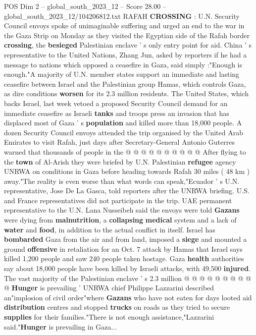 \begin{textsample}{POS Dim 2 – global\_south\_2023\_12 – Score 28.00 – global\_south\_2023\_12/104206812.txt}  \label{ex:f2_pos_028}
RAFAH \textbf{CROSSING} : U.N.
Security Council envoys spoke of unimaginable suffering and urged an end to the war in the Gaza Strip on Monday as they visited the Egyptian side of the Rafah border \textbf{crossing}, the \textbf{besieged} Palestinian enclave ' s only entry point for aid.
China ' s representative to the United Nations, Zhang Jun, asked by reporters if he had a message to nations which opposed a ceasefire in Gaza, said simply :"Enough is enough."A majority of U.N. member states support an immediate and lasting ceasefire between Israel and the Palestinian group Hamas, which controls Gaza, as dire conditions \textbf{worsen} for its 2.3 million residents.
The United States, which backs Israel, last week vetoed a proposed Security Council demand for an immediate ceasefire as Israeli \textbf{tanks} and troops press an invasion that has displaced most of Gaza ' s \textbf{population} and killed more than 18,000 people.
A dozen Security Council envoys attended the trip organised by the United Arab Emirates to visit Rafah, just days after Secretary-General Antonio Guterres warned that thousands of people in the @ @ @ @ @ @ @ @ @ @ After flying to the \textbf{town} of Al-Arish they were briefed by U.N.
Palestinian \textbf{refugee} agency UNRWA on conditions in Gaza before heading towards Rafah 30 miles ( 48 km ) away."The reality is even worse than what words can speak,"Ecuador ' s U.N. representative, Jose De La Gasca, told reporters after the UNRWA briefing.
U.S. and France representatives did not participate in the trip.
UAE permanent representative to the U.N.
Lana Nusseibeh said the envoys were told \textbf{Gazans} were dying from \textbf{malnutrition}, a \textbf{collapsing} \textbf{medical} system and a lack of \textbf{water} and \textbf{food}, in addition to the actual conflict in itself.
Israel has \textbf{bombarded} Gaza from the air and from land, imposed a \textbf{siege} and mounted a ground \textbf{offensive} in retaliation for an Oct. 7 attack by Hamas that Israel says killed 1,200 people and saw 240 people taken hostage.
Gaza \textbf{health} authorities say about 18,000 people have been killed by Israeli attacks, with 49,500 \textbf{injured}.
The vast majority of the Palestinian enclave ' s 2.3 million @ @ @ @ @ @ @ @ @ @ \textbf{Hunger} is prevailing ' UNRWA chief Philippe Lazzarini described an"implosion of civil order"where \textbf{Gazans} who have not eaten for days looted aid \textbf{distribution} centres and stopped \textbf{trucks} on roads as they tried to secure \textbf{supplies} for their families."There is not enough assistance,"Lazzarini said."\textbf{Hunger} is prevailing in Gaza...

\end{textsample}
